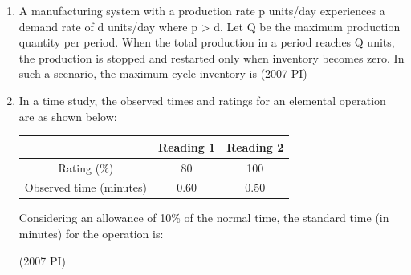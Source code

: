 \begin{enumerate}[label=\thesubsection.\arabic*,ref=\thesubsection.\theenumi]
The solution to this problem is \( x = y = 5 \). 
What is the value of the Lagrange multiplier corresponding to the perimeter constraint?
\hfill (2007 PI)
%
\begin{enumerate}
\end{enumerate}
%
\item 
A manufacturing system with a production rate p units/day experiences a demand rate of d units/day where p > d. Let Q be the maximum production quantity per period. When the total production in a period reaches Q units, the production is stopped and restarted only when inventory becomes zero. In such a scenario, the maximum cycle inventory is
\hfill (2007 PI)
\begin{enumerate}
\end{enumerate}

\item 
In a time study, the observed times and ratings for an elemental operation are as shown below:

\begin{center}
\begin{tabular}{|c|c|c|}
\hline
 & {Reading 1} & {Reading 2} \\
\hline
{Rating (\%)} & 80 & 100 \\
\hline
{Observed time (minutes)} & 0.60 & 0.50 \\
\hline
\end{tabular}
\end{center}

Considering an allowance of 10\% of the normal time, the standard time (in minutes) for the operation is:

\hfill (2007 PI)

\begin{enumerate}
\end{enumerate}


\end{enumerate}
